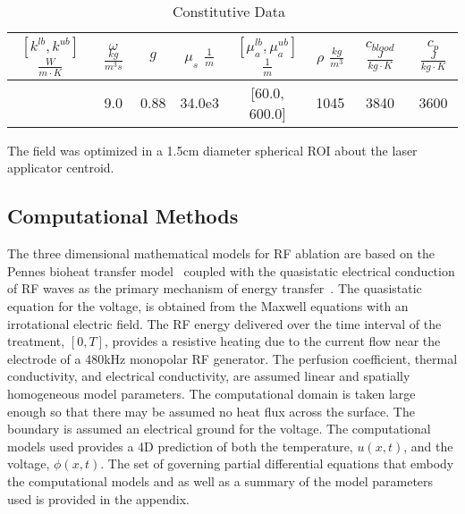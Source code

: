 \documentclass{article}
\begin{document}
\begin{table}[h]
\caption{Constitutive Data~\cite{Handbook05,Welch95,duck1990}}\label{modeldata}
\centering 
\begin{tabular}{|c|c|c|c|c|c|c|c|} \hline 
$[k^{lb},k^{ub}]$ $ \frac{W}{ m \cdot K}$ & $\omega$ $\frac{kg}{m^3 s}$ &  $g$  &  $\mu_s$ $\frac{1}{m}$  &  $[\mu_a^{lb},\mu_a^{ub}]$  $\frac{1}{m}$   &  $\rho$ $\frac{kg}{m^3}$ &   $c_{blood}$ $ \frac{J}{kg \cdot K}$ &  $c_p$ $\frac{J}{kg \cdot K}$ \\ \hline
          [0.1, 0.7]                    &             9.0             & 0.88  &       34.0e3              &     [60.0, 600.0]                             &  1045                        &            3840                      &                  3600          \\ \hline
\end{tabular}
\end{table}

The field was optimized in a 1.5cm diameter spherical ROI about
the laser applicator centroid.


\subsection{Computational Methods}

The three dimensional mathematical models for RF ablation are based on the
Pennes bioheat transfer model~\cite{Pennes48} coupled with the quasistatic
electrical conduction of RF waves as the primary mechanism of energy
transfer~\cite{chang2004tml}. The quasistatic equation for the voltage, is
obtained from the Maxwell equations with an irrotational electric field. The
RF energy delivered over the time interval of the treatment, $[0,T]$,
provides a resistive heating due to the current flow near the electrode of a
480kHz monopolar RF generator.  The perfusion coefficient, thermal
conductivity, and electrical conductivity, are assumed linear and spatially
homogeneous model parameters.  The computational domain is taken large
enough so that there may be assumed no heat flux across the surface.  The
boundary is assumed an electrical ground for the voltage.  The computational
models used provides a 4D prediction of both the temperature, $u(x,t)$, and
the voltage, $\phi(x,t)$.  The set of governing partial differential
equations that embody the computational models and as well as a summary of
the model parameters used is provided in the appendix.
\end{document}
